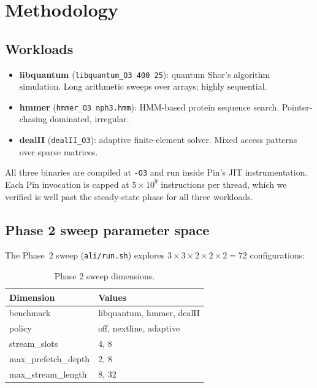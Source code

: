 \documentclass[11pt,letterpaper]{article}
\begin{document}
\section{Methodology}
\label{sec:methodology}

\subsection{Workloads}
\begin{itemize}
  \item \textbf{libquantum} (\texttt{libquantum\_O3 400 25}): quantum
        Shor's algorithm simulation. Long arithmetic sweeps over arrays;
        highly sequential.
  \item \textbf{hmmer} (\texttt{hmmer\_O3 nph3.hmm}): HMM-based protein
        sequence search. Pointer-chasing dominated, irregular.
  \item \textbf{dealII} (\texttt{dealII\_O3}): adaptive finite-element
        solver. Mixed access patterns over sparse matrices.
\end{itemize}
All three binaries are compiled at \texttt{-O3} and run inside Pin's
JIT instrumentation. Each Pin invocation is capped at $5\times10^9$
instructions per thread, which we verified is well past the steady-state
phase for all three workloads.

\subsection{Phase 2 sweep parameter space}
The Phase~2 sweep (\texttt{ali/run.sh}) explores
$3 \times 3 \times 2 \times 2 \times 2 = 72$ configurations:

\begin{table}[H]
\centering
\caption{Phase 2 sweep dimensions.}
\begin{tabular}{ll}
\toprule
Dimension & Values \\
\midrule
benchmark             & libquantum, hmmer, dealII \\
policy                & off, nextline, adaptive \\
stream\_slots         & 4, 8 \\
max\_prefetch\_depth  & 2, 8 \\
max\_stream\_length   & 8, 32 \\
\bottomrule
\end{tabular}
\end{table}
\end{document}
